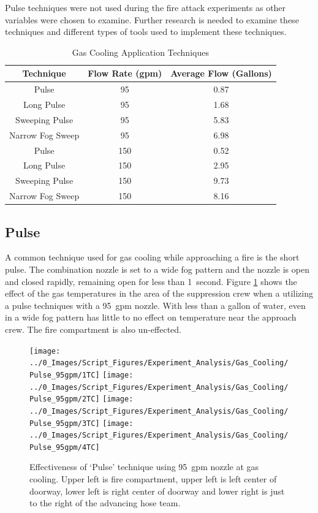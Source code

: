 \documentclass[12pt,oneside]{book}
\begin{document}
Pulse techniques were not used during the fire attack experiments as other variables were chosen to examine.  Further research is needed to examine these techniques and different types of tools used to implement these techniques.

\begin{table}[H]
\centering
\caption{Gas Cooling Application Techniques}
\begin{tabular}{|c|c|c|}
\hline
Technique & Flow Rate (gpm) & Average Flow (Gallons)\\ \hline \hline
Pulse & 95 & 0.87 \\ \hline
Long Pulse & 95 & 1.68 \\ \hline
Sweeping Pulse & 95 & 5.83 \\ \hline
Narrow Fog Sweep & 95 & 6.98 \\ \hline
Pulse & 150 & 0.52 \\ \hline
Long Pulse & 150 & 2.95 \\ \hline
Sweeping Pulse & 150 & 9.73 \\ \hline
Narrow Fog Sweep & 150 & 8.16 \\ \hline
\end{tabular}
\label{tab:Gas_Cooling_Techniques}
\end{table}

\subsection{Pulse}
A common technique used for gas cooling while approaching a fire is the short pulse. The combination nozzle is set to a wide fog pattern and the nozzle is open and closed rapidly, remaining open for less than 1~second. Figure \ref{fig:gas_pulse_95} shows the effect of the gas temperatures in the area of the suppression crew when a utilizing a pulse techniques with a 95~gpm nozzle. With less than a gallon of water, even in a wide fog pattern has little to no effect on temperature near the approach crew. The fire compartment is also un-effected. 

\begin{figure}[H]
\centering
\texttt{[image: ../0\_Images/Script\_Figures/Experiment\_Analysis/Gas\_Cooling/Pulse\_95gpm/1TC]}
\texttt{[image: ../0\_Images/Script\_Figures/Experiment\_Analysis/Gas\_Cooling/Pulse\_95gpm/2TC]}
\texttt{[image: ../0\_Images/Script\_Figures/Experiment\_Analysis/Gas\_Cooling/Pulse\_95gpm/3TC]}
\texttt{[image: ../0\_Images/Script\_Figures/Experiment\_Analysis/Gas\_Cooling/Pulse\_95gpm/4TC]}
\caption[Gas Cooling - Pulse 95~gpm]{Effectiveness of `Pulse' technique using 95~gpm nozzle at gas cooling. Upper left is fire compartment, upper left is left center of doorway, lower left is right center of doorway and lower right is just to the right of the advancing hose team.}
\label{fig:gas_pulse_95}
\end{figure}
\end{document}

